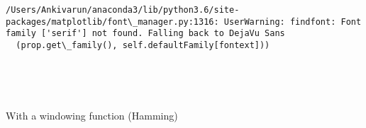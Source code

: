 \documentclass[11pt]{article}
\begin{document}
    \begin{Verbatim}[commandchars=\\\{\}]
/Users/Ankivarun/anaconda3/lib/python3.6/site-packages/matplotlib/font\_manager.py:1316: UserWarning: findfont: Font family ['serif'] not found. Falling back to DejaVu Sans
  (prop.get\_family(), self.defaultFamily[fontext]))

    \end{Verbatim}

    \begin{center}
    \end{center}
    { \hspace*{\fill} \\}
    
    \begin{center}
    \end{center}
    { \hspace*{\fill} \\}
    
    With a windowing function (Hamming)
\end{document}
